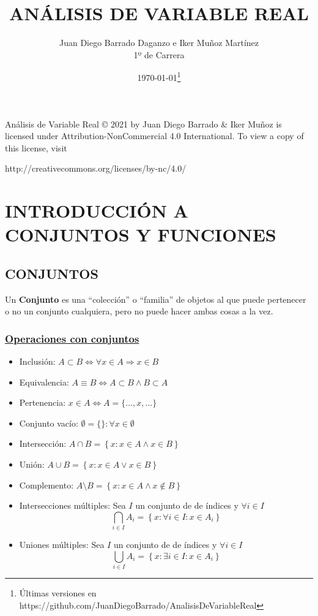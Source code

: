 \documentclass[10pt,a4paper,openright]{book}
\title{ANÁLISIS DE VARIABLE REAL}
\author{Juan Diego Barrado Daganzo e Iker Muñoz Martínez\\1º de Carrera} %
\date{\today\footnote{Últimas versiones en https://github.com/JuanDiegoBarrado/AnalisisDeVariableReal}}
\theoremstyle{break}
\begin{document}
\maketitle
\frontmatter
Análisis de Variable Real © 2021 by Juan Diego Barrado \& Iker Muñoz is licensed under Attribution-NonCommercial 4.0 International. To view a copy of this license, visit
\begin{center}
http://creativecommons.org/licenses/by-nc/4.0/
\end{center}

\hypersetup{linkcolor=black}
\setcounter{tocdepth}{3}%
\tableofcontents
\hypersetup{linkcolor=blue}

\mainmatter
\chapter{INTRODUCCIÓN A CONJUNTOS Y FUNCIONES}
\section{CONJUNTOS}
Un \textbf{Conjunto} es una ``colección'' o ``familia'' de objetos al que puede pertenecer o no un conjunto cualquiera, pero no puede hacer ambas cosas a la vez.
\subsection{\underline{Operaciones con conjuntos}}
\begin{itemize}
\item Inclusión: $A\subset B \Leftrightarrow \forall x \in A \Rightarrow x \in B$
\item Equivalencia: $A \equiv B \Leftrightarrow A \subset B \wedge B \subset A$
\item Pertenencia: $x \in A \Leftrightarrow A=\{...,x,...\}$
\item Conjunto vacío: $\emptyset=\{\}: \forall x \in \emptyset$
\item Intersección: $A \cap B=\left\lbrace x: x\in A \wedge x\in B \right\rbrace$
\item Unión: $A \cup B=\left\lbrace x: x\in A \vee x\in B \right\rbrace$
\item Complemento: $A \mbox{\textbackslash} B=\left\lbrace x: x\in A \wedge x\notin B \right\rbrace$
\item Intersecciones múltiples: Sea $I$ un conjunto de de índices y $\forall i \in I$
$$\bigcap_{i\in I}A_i=\left\lbrace x: \forall i \in I : x\in A_i\right\rbrace$$
\item Uniones múltiples: Sea $I$ un conjunto de de índices y $\forall i \in I$
$$\bigcup_{i\in I}A_i=\left\lbrace x: \exists i \in I: x\in A_i\right\rbrace$$
\end{itemize}
\end{document}
